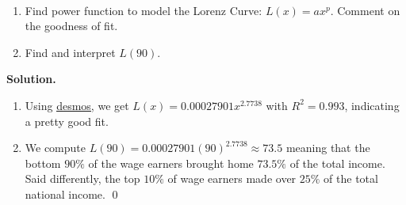 \documentclass{ximera}
\begin{document}
\begin{example} \label{LorenzEx}  $~$

\begin{enumerate}

\item Find power function to model the Lorenz Curve: $L(x) = ax^p$.  Comment on the goodness of fit.  

\item Find and interpret $L(90)$.

\end{enumerate}

{\bf Solution.}  

\begin{enumerate}

\item Using \href{https://www.desmos.com/}{\underline{desmos}}, we get $L(x) = 0.00027901x^{2.7738}$ with $R^2 = 0.993$, indicating a pretty good fit.  

\begin{center}
\end{center}


\item We compute $L(90) = 0.00027901(90)^{2.7738} \approx 73.5$ meaning that the bottom $90 \%$ of the wage earners brought home $73.5 \%$ of the total income.  Said differently, the top $10 \%$ of wage earners made over $25 \%$ of the total national income.  \qed


\end{enumerate}


 
\end{example}



\closegraphsfile
\end{document}
